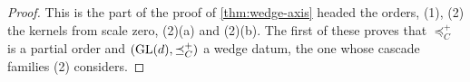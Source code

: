 \begin{proof}
\leanok
This is the part of the proof of \ref{thm:wedge-axis} headed the orders, (1), (2)
the kernels from scale zero, (2)(a) and (2)(b). The first of these proves that $\preceq^+_C$ is a partial
order and $(\mathrm{GL}(d), \preceq^+_C)$ a wedge datum, the one whose cascade families (2) considers.
\end{proof}

